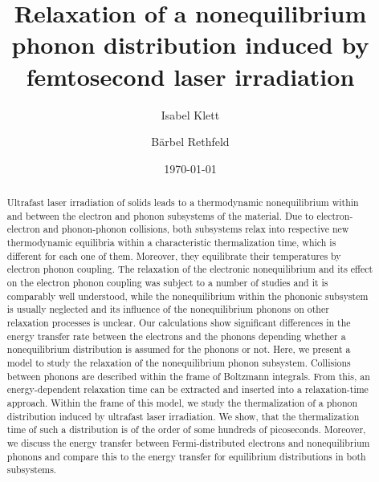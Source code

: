 \documentclass[ aps, prb, reprint, groupedaddress]{revtex4-1}
\begin{document}
\title{Relaxation of a nonequilibrium phonon distribution induced by femtosecond laser irradiation}

\author{Isabel Klett}


\author{B\"arbel Rethfeld}





\date{\today}

\begin{abstract}
Ultrafast laser irradiation of solids leads to a thermodynamic nonequilibrium within and between the electron and phonon subsystems of the material.
Due to electron-electron and phonon-phonon collisions, both subsystems relax into respective 
new thermodynamic equilibria within a characteristic thermalization time, which is different for each one of them. Moreover, they equilibrate their temperatures by electron phonon coupling.
The relaxation of the electronic nonequilibrium and its effect on the electron phonon coupling was subject to a number of studies and it is 
comparably well understood, while the nonequilibrium within the phononic subsystem is usually neglected
and its influence of the nonequilibrium phonons on other relaxation processes is unclear. Our calculations show significant differences in the energy transfer rate between the 
electrons and the phonons depending whether a nonequilibrium distribution is assumed for the phonons or not.
Here, we present a model to study the relaxation of the nonequilibrium phonon subsystem. Collisions between phonons are described within the frame of Boltzmann integrals. 
From this, an energy-dependent relaxation time
can be extracted and inserted into a relaxation-time approach. Within the frame of this model, we study the thermalization of a phonon distribution induced by ultrafast laser irradiation.
We show, that the thermalization time of such a distribution is of the order of some hundreds of picoseconds. Moreover, we discuss the energy transfer between Fermi-distributed electrons and nonequilibrium phonons and 
compare this to the energy transfer for equilibrium distributions in both subsystems.
\end{abstract}

\pacs{}
\end{document}

